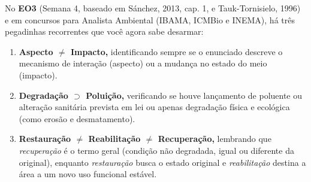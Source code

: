 \begin{boxDica}
No \textbf{EO3} (Semana 4, baseado em Sánchez, 2013, cap. 1, e Tauk-Tornisielo, 1996) e em concursos para Analista Ambiental (IBAMA, ICMBio e INEMA), há três pegadinhas recorrentes que você agora sabe desarmar:
\begin{enumerate}[leftmargin=1.5em, itemsep=1.5pt]
  \item \textbf{Aspecto $\neq$ Impacto,} identificando sempre se o enunciado descreve o mecanismo de interação (aspecto) ou a mudança no estado do meio (impacto).
  \item \textbf{Degradação $\supset$ Poluição,} verificando se houve lançamento de poluente ou alteração sanitária prevista em lei ou apenas degradação física e ecológica (como erosão e desmatamento).
  \item \textbf{Restauração $\neq$ Reabilitação $\neq$ Recuperação,} lembrando que \textit{recuperação} é o termo geral (condição não degradada, igual ou diferente da original), enquanto \textit{restauração} busca o estado original e \textit{reabilitação} destina a área a um novo uso funcional estável.
\end{enumerate}
\end{boxDica}

